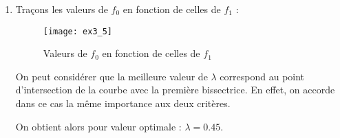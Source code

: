 \documentclass[12pt,a4paper,titlepage]{article}
\begin{document}
\begin{enumerate}
    \item{
            Traçons les valeurs de $f_0$ en fonction de celles de $f_1$ :

            \begin{figure}[H]
                \centering
                \texttt{[image: ex3\_5]}
                \caption{Valeurs de $f_0$ en fonction de celles de $f_1$}
            \end{figure}

            On peut considérer que la meilleure valeur de $\lambda$ correspond au point 
            d'intersection de la courbe avec la première bissectrice. En effet, 
            on accorde dans ce cas la même importance aux deux critères.

            On obtient alors pour valeur optimale : $\lambda = 0.45$.
        }

\end{enumerate}

\newpage
\end{document}
